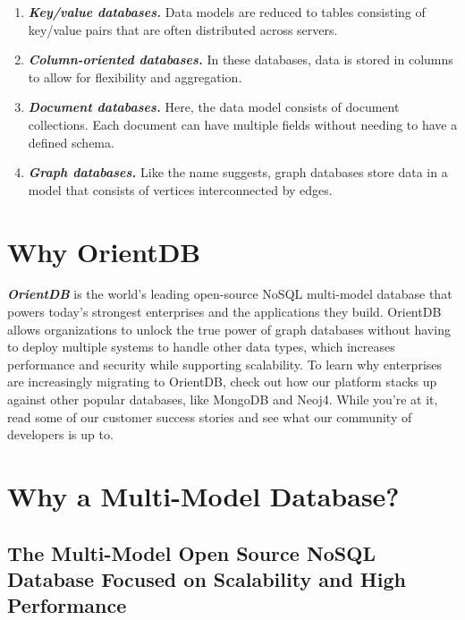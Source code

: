 \documentclass[
	final,
	a4paper,
	oneside,
	parskip=half,
	headings=standardclasses,
	headings=big,
	pointednumbers,
    fleqn
]{scrartcl}
\newcommand{\brand}[1]{\textbf{\textit{#1}}}
\begin{document}
\begin{multicols*}{2}
            \begin{enumerate}
                \item{
                    \brand{Key/value databases.} Data models are reduced to tables consisting of key/value pairs that are often distributed across servers.
                }
                \item{
                    \brand{Column-oriented databases.} In these databases, data is stored in columns to allow for flexibility and aggregation.
                }
                \item{
                    \brand{Document databases.} Here, the data model consists of document collections. Each document can have multiple fields without needing to have a defined schema.
                }
                \item{
                    \brand{Graph databases.} Like the name suggests, graph databases store data in a model that consists of vertices interconnected by edges.
                }
            \end{enumerate}

    \section{Why OrientDB}
    
        \brand{OrientDB} is the world’s leading open-source NoSQL multi-model database that powers today’s strongest enterprises and the applications they build. OrientDB allows organizations to unlock the true power of graph databases without having to deploy multiple systems to handle other data types, which increases performance and security while supporting scalability. To learn why enterprises are increasingly migrating to OrientDB, check out how our platform stacks up against other popular databases, like MongoDB and Neoj4. While you’re at it, read some of our customer success stories and see what our community of developers is up to.
        
    \section{Why a Multi-Model Database?}
        
        \subsection{The Multi-Model Open Source NoSQL Database Focused on Scalability and High Performance}


\end{multicols*}
\end{document}
